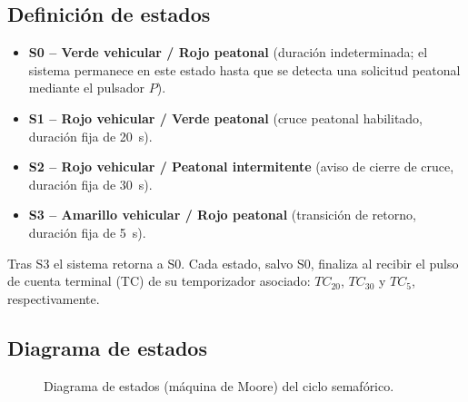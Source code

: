 \documentclass[10pt,onecolumn]{IEEEtran}
\begin{document}
\subsection{Definición de estados}
\begin{itemize}
    \item \textbf{S0 -- Verde vehicular / Rojo peatonal} (duración indeterminada; el sistema permanece en este estado hasta que se detecta una solicitud peatonal mediante el pulsador $P$).
    \item \textbf{S1 -- Rojo vehicular / Verde peatonal} (cruce peatonal habilitado, duración fija de \SI{20}{\second}).
    \item \textbf{S2 -- Rojo vehicular / Peatonal intermitente} (aviso de cierre de cruce, duración fija de \SI{30}{\second}).
    \item \textbf{S3 -- Amarillo vehicular / Rojo peatonal} (transición de retorno, duración fija de \SI{5}{\second}).
\end{itemize}
Tras S3 el sistema retorna a S0. Cada estado, salvo S0, finaliza al recibir el pulso de cuenta terminal (TC) de su temporizador asociado: $TC_{20}$, $TC_{30}$ y $TC_{5}$, respectivamente.
\\
\subsection{Diagrama de estados}
\begin{figure}[H]
\centering
{}
\caption{Diagrama de estados (máquina de Moore) del ciclo semafórico.}
\label{fig:estados}
\end{figure}
\end{document}
